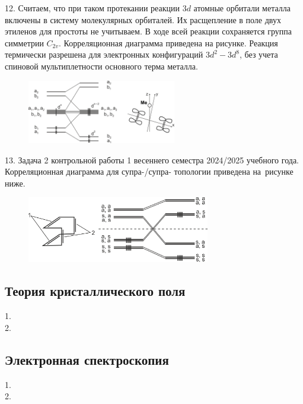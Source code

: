 12. Считаем, что при таком протекании реакции $3d$ атомные орбитали металла включены в систему молекулярных орбиталей. Их расщепление в поле двух этиленов для простоты не учитываем. В ходе всей реакции сохраняется группа симметрии $C_{2v}$. Корреляционная диаграмма приведена на рисунке. Реакция термически разрешена для электронных конфигураций $3d^2-3d^8$, без учета спиновой мультиплетности основного терма металла.\par
\vspace{-\parskip}
\vspace{1.5mm}
\begin{figure}[h]
\includegraphics[width=6.5cm]{images/Fig_2_1_12_dec.png}
\centering
\end{figure}
\par
13. Задача 2 контрольной работы 1 весеннего семестра 2024/2025 учебного года. Корреляционная диаграмма для супра-/супра- топологии приведена на~рисунке ниже.
\vspace{-\parskip}
\vspace{1.5mm}
\begin{figure}[h]
\includegraphics[width=8cm]{images/Fig_2_1_13_dec.png}
\centering
\end{figure}
\par
\vspace{-\parskip}
\newpage

\subsection{Теория кристаллического поля}
1. \\
2. 
\newpage

\subsection{Электронная спектроскопия}
1. \\
2. 
\newpage

